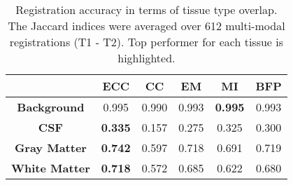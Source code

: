 \begin{table}[htbp]
  \centering
  {\small
    \begin{tabular}{cccccc}
    \toprule
          & \textbf{ECC} & \textbf{CC} & \textbf{EM} & \textbf{MI} & \textbf{BFP}\\
    \midrule
    \textbf{Background} & 0.995 & 0.990 & 0.993 & \textbf{0.995} & 0.993\\
    \textbf{CSF} & \textbf{0.335} & 0.157 & 0.275 & 0.325 & 0.300\\
    \textbf{Gray Matter} & \textbf{0.742} & 0.597 & 0.718 & 0.691 & 0.719\\
    \textbf{White Matter} & \textbf{0.718} & 0.572 & 0.685 & 0.622 & 0.680\\
    \bottomrule
    \end{tabular}}%
  \caption{{\small Registration accuracy in terms of tissue type overlap. The Jaccard indices were averaged over 612 multi-modal registrations (T1 - T2). Top performer for each tissue is highlighted.}}
  \label{tab:multimodal_results_segTri_fill}%
\end{table}%
